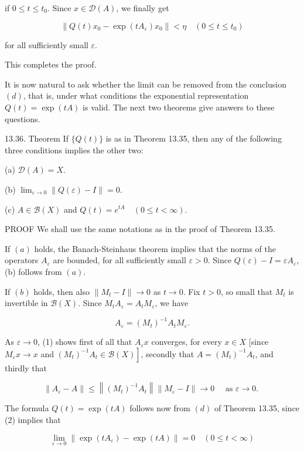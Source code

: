 \documentclass[10pt]{article}
\begin{document}
if $0 \leq t \leq t_{0}$. Since $x \in \mathscr{D}(A)$, we finally get

$$
\left\|Q(t) x_{0}-\exp \left(t A_{\varepsilon}\right) x_{0}\right\|<\eta \quad\left(0 \leq t \leq t_{0}\right)
$$

for all sufficiently small $\varepsilon$.

This completes the proof.

It is now natural to ask whether the limit can be removed from the conclusion $(d)$, that is, under what conditions the exponential representation $Q(t)=\exp (t A)$ is valid. The next two theorems give answers to these questions.

13.36. Theorem If $\{Q(t)\}$ is as in Theorem 13.35, then any of the following three conditions implies the other two:

(a) $\mathscr{D}(A)=X$.

(b) $\lim _{\varepsilon \rightarrow 0}\|Q(\varepsilon)-I\|=0$.

(c) $A \in \mathscr{B}(X)$ and $Q(t)=e^{t A} \quad(0 \leq t<\infty)$.

PROOF We shall use the same notations as in the proof of Theorem 13.35.

If $(a)$ holds, the Banach-Steinhaus theorem implies that the norms of the operators $A_{\varepsilon}$ are bounded, for all sufficiently small $\varepsilon>0$. Since $Q(\varepsilon)-I=\varepsilon A_{\varepsilon}$, (b) follows from $(a)$.

If $(b)$ holds, then also $\left\|M_{t}-I\right\| \rightarrow 0$ as $t \rightarrow 0$. Fix $t>0$, so small that $M_{t}$ is invertible in $\mathscr{B}(X)$. Since $M_{t} A_{\varepsilon}=A_{t} M_{\varepsilon}$, we have

$$
A_{\varepsilon}=\left(M_{t}\right)^{-1} A_{t} M_{\varepsilon} .
$$

As $\varepsilon \rightarrow 0$, (1) shows first of all that $A_{\varepsilon} x$ converges, for every $x \in X$ [since $M_{\varepsilon} x \rightarrow x$ and $\left.\left(M_{t}\right)^{-1} A_{t} \in \mathscr{B}(X)\right]$, secondly that $A=\left(M_{t}\right)^{-1} A_{t}$, and thirdly that

$$
\left\|A_{\varepsilon}-A\right\| \leq\left\|\left(M_{t}\right)^{-1} A_{t}\right\|\left\|M_{\varepsilon}-I\right\| \rightarrow 0 \quad \text { as } \varepsilon \rightarrow 0 \text {. }
$$

The formula $Q(t)=\exp (t A)$ follows now from $(d)$ of Theorem 13.35, since (2) implies that

$$
\lim _{\varepsilon \rightarrow 0}\left\|\exp \left(t A_{\varepsilon}\right)-\exp (t A)\right\|=0 \quad(0 \leq t<\infty)
$$
\end{document}
